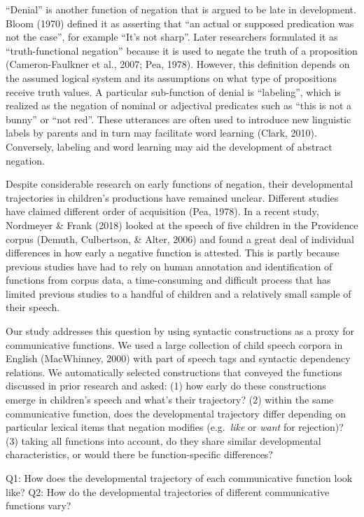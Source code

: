 \documentclass[10pt, letterpaper]{article}
\begin{document}
``Denial'' is another function of negation that is argued to be late in
development. Bloom (1970) defined it as asserting that ``an actual or
supposed predication was not the case'', for example ``It's not sharp''.
Later researchers formulated it as ``truth-functional negation'' because
it is used to negate the truth of a proposition (Cameron-Faulkner et
al., 2007; Pea, 1978). However, this definition depends on the assumed
logical system and its assumptions on what type of propositions receive
truth values. A particular sub-function of denial is ``labeling'', which
is realized as the negation of nominal or adjectival predicates such as
``this is not a bunny'' or ``not red''. These utterances are often used
to introduce new linguistic labels by parents and in turn may facilitate
word learning (Clark, 2010). Conversely, labeling and word learning may
aid the development of abstract negation.

Despite considerable research on early functions of negation, their
developmental trajectories in children's productions have remained
unclear. Different studies have claimed different order of acquisition
(Pea, 1978). In a recent study, Nordmeyer \& Frank (2018) looked at the
speech of five children in the Providence corpus (Demuth, Culbertson, \&
Alter, 2006) and found a great deal of individual differences in how
early a negative function is attested. This is partly because previous
studies have had to rely on human annotation and identification of
functions from corpus data, a time-consuming and difficult process that
has limited previous studies to a handful of children and a relatively
small sample of their speech.

Our study addresses this question by using syntactic constructions as a
proxy for communicative functions. We used a large collection of child
speech corpora in English (MacWhinney, 2000) with part of speech tags
and syntactic dependency relations. We automatically selected
constructions that conveyed the functions discussed in prior research
and asked: (1) how early do these constructions emerge in children's
speech and what's their trajectory? (2) within the same communicative
function, does the developmental trajectory differ depending on
particular lexical items that negation modifies (e.g.~\emph{like} or
\emph{want} for rejection)? (3) taking all functions into account, do
they share similar developmental characteristics, or would there be
function-specific differences?

Q1: How does the developmental trajectory of each communicative function
look like? Q2: How do the developmental trajectories of different
communicative functions vary?
\end{document}
